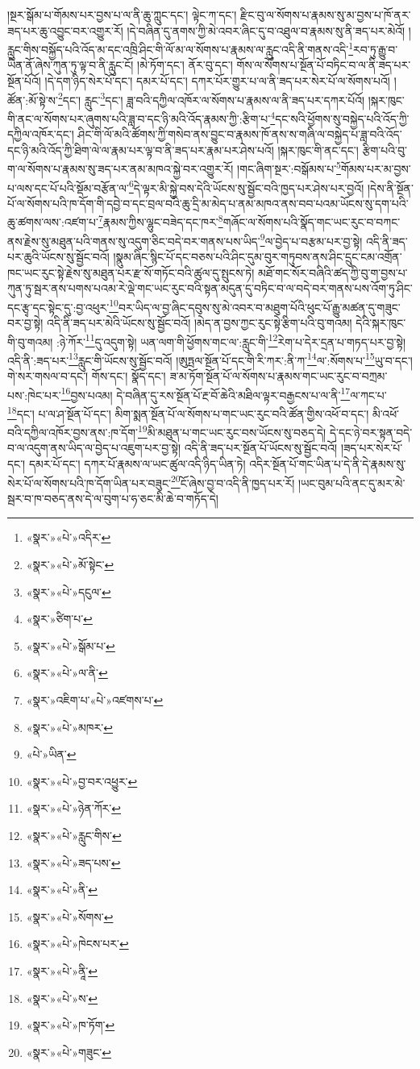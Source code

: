 །སྔར་སྒོམ་པ་གོམས་པར་བྱས་པ་ལ་ནི་ཆུ་ཀླུང་དང་། ལྟེང་ཀ་དང་། རྫིང་བུ་ལ་སོགས་པ་རྣམས་སུ་མ་བྱས་པ་ཁོ་ནར་ཟད་པར་ཆུ་འབྱུང་བར་འགྱུར་རོ། །དེ་བཞིན་དུ་ནགས་ཀྱི་མེ་འབར་ཞིང་དུ་བ་འཐུལ་བ་རྣམས་སུ་ནི་ཟད་པར་མེའོ། །རླུང་གིས་བསྐྱོད་པའི་འོད་མ་དང་འཁྲི་ཤིང་གི་ལོ་མ་ལ་སོགས་པ་རྣམས་ལ་རླུང་འདི་ནི་གནས་འདི་\footnote{«སྣར་»«པེ་»འདིར་}རབ་ཏུ་རྒྱུ་བ་ཡིན་ནོ་ཞེས་ཀུན་ཏུ་ལྟ་བ་ནི་རླུང་ངོ། །མེ་ཏོག་དང་། ནོར་བུ་དང་། གོས་ལ་སོགས་པ་སྔོན་པོ་བཏིང་བ་ལ་ནི་ཟད་པར་སྔོན་པོའོ། །དེ་དག་ཉིད་སེར་པོ་དང་། དམར་པོ་དང་། དཀར་པོར་གྱུར་པ་ལ་ནི་ཟད་པར་སེར་པོ་ལ་སོགས་པའོ། །ཚོན་:མོ་སྟེ་ས་\footnote{«སྣར་»«པེ་»མོ་སྟེང་}དང་། རླུང་\footnote{«སྣར་»«པེ་»དངུལ་}དང་། ཟླ་བའི་དཀྱིལ་འཁོར་ལ་སོགས་པ་རྣམས་ལ་ནི་ཟད་པར་དཀར་པོའོ། །སྐར་ཁུང་གི་ནང་ལ་སོགས་པར་ཞུགས་པའི་ཟླ་བ་དང་ཉི་མའི་འོད་རྣམས་ཀྱི་:རྩིག་པ་\footnote{«སྣར་»ཙིག་པ་}དང་སའི་ཕྱོགས་སུ་བསྐྱེད་པའི་འོད་ཀྱི་དཀྱིལ་འཁོར་དང་། ཤིང་གི་ལོ་མའི་ཚོགས་ཀྱི་གསེབ་ནས་བྱུང་བ་རྣམས་ཁོ་ནས་ས་གཞི་ལ་བསྐྱེད་པ་ཟླ་བའི་འོད་དང་ཉི་མའི་འོད་ཀྱི་ཐིག་ལེ་ལ་རྣམ་པར་ལྟ་བ་ནི་ཟད་པར་རྣམ་པར་ཤེས་པའོ། །སྐར་ཁུང་གི་ནང་དང་། རྩིག་པའི་བུ་ག་ལ་སོགས་པ་རྣམས་སུ་ཟད་པར་ནམ་མཁའ་སྐྱེ་བར་འགྱུར་རོ། །གང་ཞིག་སྔར་:བསྒོམས་པ་\footnote{«སྣར་»«པེ་»སྒོམ་པ་}གོམས་པར་མ་བྱས་པ་ལས་དང་པོ་པའི་སྡོམ་བརྩོན་ལ་\footnote{«སྣར་»«པེ་»ལ་ནི་}དེ་ལྟར་མི་སྐྱེ་བས་དེའི་ཡོངས་སུ་སྦྱོང་བའི་ཁྱད་པར་ཤེས་པར་བྱའོ། །དེས་ནི་སྔོན་པོ་ལ་སོགས་པའི་ཁ་དོག་གི་དབྱེ་བ་དང་བྲལ་བའི་ཆུ་དྲི་མ་མེད་པ་ནམ་མཁའ་ནས་བབ་པའམ་ཡོངས་སུ་དག་པའི་ཆུ་ཚགས་ལས་:འཛག་པ་\footnote{«སྣར་»འཇིག་པ་«པེ་»འཛགས་པ་}རྣམས་ཀྱིས་ལྷུང་བཟེད་དང་ཁར་\footnote{«སྣར་»«པེ་»མཁར་}གཞོང་ལ་སོགས་པའི་སྣོད་གང་ཡང་རུང་བ་བཀང་ནས་རྗེས་སུ་མཐུན་པའི་གནས་སུ་འདུག་ཅིང་བདེ་བར་གནས་པས་ཡིད་\footnote{«པེ་»ཡིན་}ལ་བྱེད་པ་བརྩམ་པར་བྱ་སྟེ། འདི་ནི་ཟད་པར་ཆུའི་ཡོངས་སུ་སྦྱོང་བའོ། །སྣུམ་ཞིང་སྙིང་པོ་དང་བཅས་པའི་ཤིང་དུམ་བུར་གཏུབས་ནས་ཤིང་དྲུང་ངམ་འགྲོན་ཁང་ཡང་རུང་སྟེ་རྗེས་སུ་མཐུན་པར་རྫ་སོ་གཏོང་བའི་ཚུལ་དུ་སྤུངས་ཏེ། མཐོ་གང་སོར་བཞིའི་ཚད་ཀྱི་བུ་ག་བྱས་པ་ཀུན་ཏུ་སྦར་ནས་པགས་པའམ་རེ་ལྡེ་གང་ཡང་རུང་བའི་སྟན་མདུན་དུ་བཏིང་བ་ལ་བདེ་བར་གནས་པས་འོག་ཏུ་ཤིང་དང་རྩྭ་དང་སྟེང་དུ་:བྱ་འཕུར་\footnote{«སྣར་»«པེ་»བྱ་བར་འཕྱུར་}བར་ཡིད་ལ་བྱ་ཞིང་དབུས་སུ་མེ་འབར་བ་མཐུག་པོའི་ཕུང་པོ་རྒྱུ་མཚན་དུ་གཟུང་བར་བྱ་སྟེ། འདི་ནི་ཟད་པར་མེའི་ཡོངས་སུ་སྦྱོང་བའོ། །མེད་ན་བྱས་ཀྱང་རུང་སྟེ་རྩིག་པའི་བུ་གའམ། དེའི་སྐར་ཁུང་གི་བུ་གའམ། :ཉེ་ཀོར་\footnote{«སྣར་»«པེ་»ཉེན་ཀོར་}དུ་འདུག་སྟེ། ཡན་ལག་གི་ཕྱོགས་གང་ལ་:རླུང་གི་\footnote{«སྣར་»«པེ་»རླུང་གིས་}རེག་པ་དེར་དྲན་པ་གཏད་པར་བྱ་སྟེ། འདི་ནི་:ཟད་པར་\footnote{«སྣར་»«པེ་»ཟད་པས་}རླུང་གི་ཡོངས་སུ་སྦྱོང་བའོ། །ཨུཏྤལ་སྔོན་པོ་དང་གི་རི་ཀར་:ནི་ཀ་\footnote{«སྣར་»«པེ་»ནི་}ལ་:སོགས་པ་\footnote{«སྣར་»«པེ་»སོགས་}ཡུ་བ་དང་། གེ་སར་གསལ་བ་དང་། གོས་དང་། སྣོད་དང་། ཟ་མ་ཏོག་སྔོན་པོ་ལ་སོགས་པ་རྣམས་གང་ཡང་རུང་བ་བཀྲམ་པས་:ཁེང་པར་\footnote{«སྣར་»«པེ་»ཁེངས་པར་}བྱས་པའམ། དེ་བཞིན་དུ་རས་སྔོན་པོ་རྔ་བོ་ཆེའི་མཐིལ་ལྟར་བརྒྱངས་པ་ལ་ནི་\footnote{«སྣར་»«པེ་»ནཱི་}ལ་ཀང་པ་\footnote{«སྣར་»«པེ་»ས་}དང་། པ་ལ་ཤ་སྔོན་པོ་དང་། མིག་སྨན་སྔོན་པོ་ལ་སོགས་པ་གང་ཡང་རུང་བའི་ཚོན་གྱིས་འཕོ་བ་དང་། མི་འཕོ་བའི་དཀྱིལ་འཁོར་བྱས་ནས་:ཁ་དོག་\footnote{«སྣར་»«པེ་»ཁ་ཏོག་}མི་མཐུན་པ་གང་ཡང་རུང་བས་ཡོངས་སུ་བཅད་དེ། དེ་དང་ཉེ་བར་སྟན་བདེ་བ་ལ་འདུག་ནས་ཡིད་ལ་བྱེད་པ་འཇུག་པར་བྱ་སྟེ། འདི་ནི་ཟད་པར་སྔོན་པོ་ཡོངས་སུ་སྦྱོང་བའོ། །ཟད་པར་སེར་པོ་དང་། དམར་པོ་དང་། དཀར་པོ་རྣམས་ལ་ཡང་ཚུལ་འདི་ཉིད་ཡིན་ཏེ། འདིར་སྔོན་པོ་གང་ཡིན་པ་དེ་ནི་དེ་རྣམས་སུ་སེར་པོ་ལ་སོགས་པའི་ཁ་དོག་ཡིན་པར་བཟུང་\footnote{«སྣར་»«པེ་»གཟུང་}ངོ་ཞེས་བྱ་བ་འདི་ནི་ཁྱད་པར་རོ། །ཡང་བུམ་པའི་ནང་དུ་མར་མེ་སྦར་བ་ཁ་བཅད་ནས་དེ་ལ་བུག་པ་ཧ་ཅང་མི་ཆེ་བ་གཏོད་དེ། 